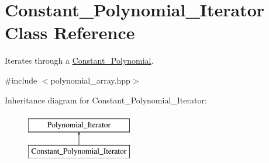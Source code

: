 \hypertarget{class_constant___polynomial___iterator}{}\section{Constant\+\_\+\+Polynomial\+\_\+\+Iterator Class Reference}
\label{class_constant___polynomial___iterator}


Iterates through a \hyperlink{class_constant___polynomial}{Constant\+\_\+\+Polynomial}.  




{\ttfamily \#include $<$polynomial\+\_\+array.\+hpp$>$}

Inheritance diagram for Constant\+\_\+\+Polynomial\+\_\+\+Iterator\+:\begin{figure}[H]
\begin{center}
\leavevmode
\includegraphics[height=2.000000cm]{class_constant___polynomial___iterator}
\end{center}
\end{figure}
